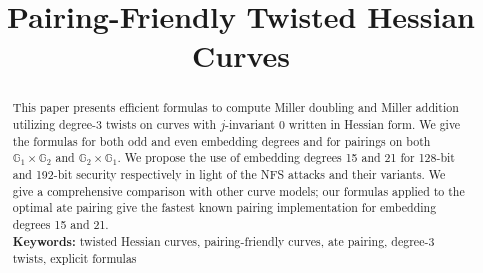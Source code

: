 \documentclass[11pt,runningheads]{llncs}
\newif\ifpublic
\begin{document}
\title{Pairing-Friendly Twisted Hessian Curves}


\ifpublic
\author{
Chitchanok Chuengsatiansup\inst{1}
\and
Chloe Martindale\inst{2}
}
\authorrunning{Chuengsatiansup, Martindale}

\institute{
INRIA and ENS de Lyon\\
46 All\'{e}e d'Italie 69364 Lyon Cedex 07, France \\
\email{chitchanok.chuengsatiansup@ens-lyon.fr}
\and
Department of Mathematics and Computer Science\\
Technische Universiteit Eindhoven\\
P.O. Box 513, 5600 MB Eindhoven, The Netherlands\\
\email{c.r.martindale@tue.nl}
}
\fi


\date{}
\maketitle
\begin{abstract}
This paper presents efficient formulas to compute Miller doubling and Miller addition utilizing degree-3 twists on curves with $j$-invariant 0 written in Hessian form. 
We give the formulas for both odd and even embedding degrees and for pairings on both $\mathbb{G}_1 \times \mathbb{G}_2$ and $\mathbb{G}_{2} \times \mathbb{G}_{1}$.
We propose the use of embedding degrees 15 and 21 for 128-bit and 192-bit security respectively in light of the NFS attacks and their variants.
We give a comprehensive comparison with other curve models; our formulas 
applied to the optimal ate pairing give the fastest known pairing implementation
for embedding degrees 15 and 21.
\\[10pt]
\textbf{Keywords:}
twisted Hessian curves, pairing-friendly curves, ate pairing, degree-3 twists, explicit formulas
\end{abstract}

\ifpublic
\begingroup
\makeatletter
\def\@thefnmark{} \@footnotetext{\relax
Chitchanok Chuengsatiansup acknowledges the support of Bpifrance
in the context of the national projet RISQ (P141580).
Chloe Martindale was supported by the Commission
of the European Communities through the Horizon 2020 program under
CHIST-ERA USEIT (NWO project 651.002.004).
}
\endgroup
\fi






%



%
%
%


%






%
%
%
\end{document}
